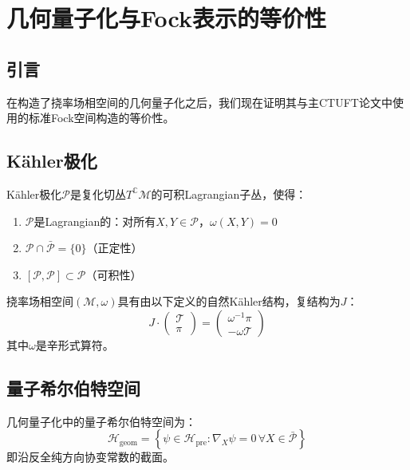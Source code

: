 \section{几何量子化与Fock表示的等价性}
\label{sec:fock_equivalence}

\subsection{引言}

在构造了挠率场相空间的几何量子化之后，我们现在证明其与主CTUFT论文中使用的标准Fock空间构造的等价性。

\subsection{Kähler极化}

\begin{definition}[Kähler极化]
Kähler极化$\mathcal{P}$是复化切丛$T^\mathbb{C}\mathcal{M}$的可积Lagrangian子丛，使得：
\begin{enumerate}
    \item $\mathcal{P}$是Lagrangian的：对所有$X, Y \in \mathcal{P}$，$\omega(X, Y) = 0$
    \item $\mathcal{P} \cap \bar{\mathcal{P}} = \{0\}$（正定性）
    \item $[\mathcal{P}, \mathcal{P}] \subset \mathcal{P}$（可积性）
\end{enumerate}
\end{definition}

\begin{theorem}[相空间的Kähler结构]
挠率场相空间$(\mathcal{M}, \omega)$具有由以下定义的自然Kähler结构，复结构为$J$：
\begin{equation}
    J \cdot \begin{pmatrix} \mathcal{T} \\ \pi \end{pmatrix} = \begin{pmatrix} \omega^{-1} \pi \\ -\omega \mathcal{T} \end{pmatrix}
\end{equation}
其中$\omega$是辛形式算符。
\end{theorem}

\subsection{量子希尔伯特空间}

\begin{definition}[量子希尔伯特空间]
几何量子化中的量子希尔伯特空间为：
\begin{equation}
    \mathcal{H}_{\text{geom}} = \left\{ \psi \in \mathcal{H}_{\text{pre}} : \nabla_X \psi = 0 \, \forall X \in \bar{\mathcal{P}} \right\}
\end{equation}
即沿反全纯方向协变常数的截面。
\end{definition}

